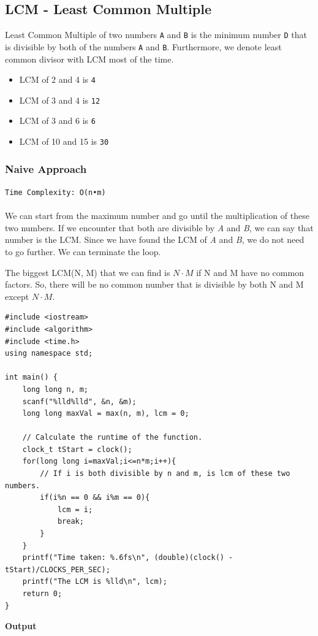 \documentclass[12pt]{article}
\begin{document}
\clearpage

\subsection{LCM - Least Common Multiple}
Least Common Multiple of two numbers \texttt{A} and \texttt{B} is the minimum number \texttt{D} that is divisible by both of the numbers \texttt{A} and \texttt{B}. Furthermore, we denote least common divisor with LCM most of the time.

\begin{itemize}
  \item LCM of 2 and 4 is \texttt{4} 
  \item LCM of 3 and 4 is \texttt{12} 
  \item LCM of 3 and 6 is \texttt{6} 
  \item LCM of 10 and 15 is \texttt{30} 
\end{itemize}

\subsubsection{Naive Approach }
\texttt{Time Complexity:  O(n•m) } \\ \\
We can start from the maximum number and go until the multiplication of these two numbers. If we encounter that both are divisible by \textit{A} and \textit{B}, we can say that number is the LCM. Since we have found the LCM of \textit{A} and \textit{B}, we do not need to go further. We can terminate the loop.

The biggest LCM(N, M) that we can find is $N \cdot M$ if  N and M have no common factors. So, there will be no common number that is divisible by both N and M except $N \cdot M$.

\begin{verbatim}
#include <iostream>
#include <algorithm>
#include <time.h>
using namespace std;

int main() {
    long long n, m;
    scanf("%lld%lld", &n, &m);
    long long maxVal = max(n, m), lcm = 0;

    // Calculate the runtime of the function.
    clock_t tStart = clock();
    for(long long i=maxVal;i<=n*m;i++){
        // If i is both divisible by n and m, is lcm of these two numbers.
        if(i%n == 0 && i%m == 0){
            lcm = i;
            break;
        }
    }
    printf("Time taken: %.6fs\n", (double)(clock() - tStart)/CLOCKS_PER_SEC);
    printf("The LCM is %lld\n", lcm);
    return 0;
}
\end{verbatim}
\textbf{Output}
\end{document}
